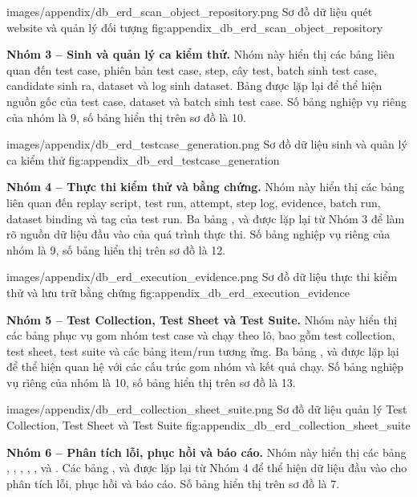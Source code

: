 \appendixERDFigure
{images/appendix/db_erd_scan_object_repository.png}
{Sơ đồ dữ liệu quét website và quản lý đối tượng}
{fig:appendix_db_erd_scan_object_repository}

\noindent\textbf{Nhóm 3 -- Sinh và quản lý ca kiểm thử.}
Nhóm này hiển thị các bảng liên quan đến test case, phiên bản test case, step, cây test, batch sinh test case, candidate sinh ra, dataset và log sinh dataset. Bảng  được lặp lại để thể hiện nguồn gốc của test case, dataset và batch sinh test case. Số bảng nghiệp vụ riêng của nhóm là 9, số bảng hiển thị trên sơ đồ là 10.

\appendixERDFigure
{images/appendix/db_erd_testcase_generation.png}
{Sơ đồ dữ liệu sinh và quản lý ca kiểm thử}
{fig:appendix_db_erd_testcase_generation}

\noindent\textbf{Nhóm 4 -- Thực thi kiểm thử và bằng chứng.}
Nhóm này hiển thị các bảng liên quan đến replay script, test run, attempt, step log, evidence, batch run, dataset binding và tag của test run. Ba bảng ,  và  được lặp lại từ Nhóm 3 để làm rõ nguồn dữ liệu đầu vào của quá trình thực thi. Số bảng nghiệp vụ riêng của nhóm là 9, số bảng hiển thị trên sơ đồ là 12.

\appendixERDFigure
{images/appendix/db_erd_execution_evidence.png}
{Sơ đồ dữ liệu thực thi kiểm thử và lưu trữ bằng chứng}
{fig:appendix_db_erd_execution_evidence}

\noindent\textbf{Nhóm 5 -- Test Collection, Test Sheet và Test Suite.}
Nhóm này hiển thị các bảng phục vụ gom nhóm test case và chạy theo lô, bao gồm test collection, test sheet, test suite và các bảng item/run tương ứng. Ba bảng ,  và  được lặp lại để thể hiện quan hệ với các cấu trúc gom nhóm và kết quả chạy. Số bảng nghiệp vụ riêng của nhóm là 10, số bảng hiển thị trên sơ đồ là 13.

\appendixERDFigure
{images/appendix/db_erd_collection_sheet_suite.png}
{Sơ đồ dữ liệu quản lý Test Collection, Test Sheet và Test Suite}
{fig:appendix_db_erd_collection_sheet_suite}

\noindent\textbf{Nhóm 6 -- Phân tích lỗi, phục hồi và báo cáo.}
Nhóm này hiển thị các bảng , , , , ,  và . Các bảng ,  và  được lặp lại từ Nhóm 4 để thể hiện dữ liệu đầu vào cho phân tích lỗi, phục hồi và báo cáo. Số bảng hiển thị trên sơ đồ là 7.

